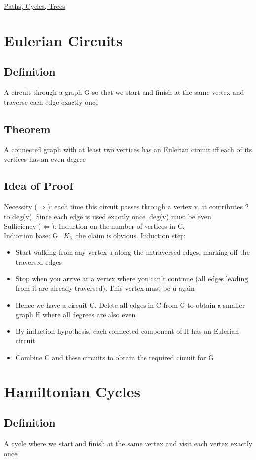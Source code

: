 \documentclass{article}[18pt]
\begin{document}
\begin{center}
\underline{\huge Paths, Cycles, Trees}
\end{center}
\section{Eulerian Circuits}
\subsection{Definition}
A circuit through a graph G so that we start and finish at the same vertex and traverse each edge exactly once

\subsection{Theorem}
A connected graph with at least two vertices has an Eulerian circuit iff each of its vertices has an even degree
\subsection{Idea of Proof}
Necessity ($\Rightarrow$): each time this circuit passes through a vertex v, it contributes 2 to deg(v). Since each edge is used exactly once, deg(v) must be even\\
Sufficiency ($\Leftarrow$): Induction on the number of vertices in G.\\
Induction base: G=$K_3$, the claim is obvious. Induction step:
\begin{itemize}
	\item Start walking from any vertex u along the untraversed edges, marking off the traversed edges
	\item Stop when you arrive at a vertex where you can't continue (all edges leading from it are already traversed). This vertex must be u again
	\item Hence we have a circuit C. Delete all edges in C from G to obtain a smaller graph H where all degrees are also even
	\item By induction hypothesis, each connected component of H has an Eulerian circuit
	\item Combine C and these circuits to obtain the required circuit for G
\end{itemize}
\section{Hamiltonian Cycles}
\subsection{Definition}
A cycle where we start and finish at the same vertex and visit each vertex exactly once
\end{document}

